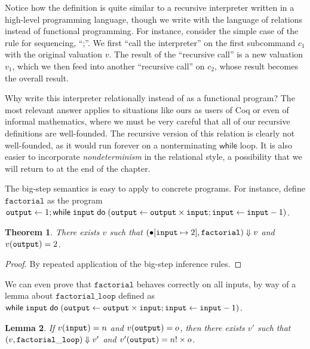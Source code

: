 \documentclass{amsbook}
\newtheorem{theorem}{Theorem}[chapter]
\newtheorem{lemma}[theorem]{Lemma}
\theoremstyle{definition}
\theoremstyle{remark}
\numberwithin{section}{chapter}
\numberwithin{equation}{chapter}
\begin{document}
Notice how the definition is quite similar to a recursive interpreter written in a high-level programming language, though we write with the language of relations instead of functional programming.
For instance, consider the simple case of the rule for sequencing, ``;''.
We first ``call the interpreter'' on the first subcommand $c_1$ with the original valuation $v$.
The result of the ``recursive call'' is a new valuation $v_1$, which we then feed into another ``recursive call'' on $c_2$, whose result becomes the overall result.

Why write this interpreter relationally instead of as a functional program?
The most relevant answer applies to situations like ours as users of Coq or even of informal mathematics, where we must be very careful that all of our recursive definitions are well-founded.
The recursive version of this relation is clearly not well-founded, as it would run forever on a nonterminating $\mathsf{while}$ loop.
It is also easier to incorporate \emph{nondeterminism} in the relational style, a possibility that we will return to at the end of the chapter.

The big-step semantics is easy to apply to concrete programs.
For instance, define $\mathtt{factorial}$ as the program $\mathtt{output} \leftarrow 1; \mathsf{while} \; \mathtt{input} \; \mathsf{do} \; (\mathtt{output} \leftarrow \mathtt{output} \times \mathtt{input}; \mathtt{input} \leftarrow \mathtt{input} - 1)$.

\begin{theorem}
  There exists $v$ such that $(\bullet[\mathtt{input} \mapsto 2], \mathtt{factorial}) \Downarrow v$ and $v(\mathtt{output}) = 2$.
\end{theorem}

\begin{proof}
  By repeated application of the big-step inference rules.
\end{proof}

We can even prove that $\mathtt{factorial}$ behaves correctly on all inputs, by way of a lemma about $\mathtt{factorial\_loop}$ defined as $\mathsf{while} \; \mathtt{input} \; \mathsf{do} \; (\mathtt{output} \leftarrow \mathtt{output} \times \mathtt{input}; \mathtt{input} \leftarrow \mathtt{input} - 1)$.

\begin{lemma}\label{factorial_loop}
  If $v(\mathtt{input}) = n$ and $v(\mathtt{output}) = o$, then there exists $v'$ such that $(v, \mathtt{factorial\_loop}) \Downarrow v'$ and $v'(\mathtt{output}) = n! \times o$.
\end{lemma}
\end{document}
